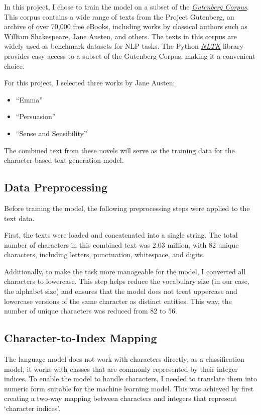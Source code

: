 \documentclass{article}
\begin{document}
In this project, I chose to train the model on a subset of the \href{https://www.gutenberg.org/}{\textit{Gutenberg Corpus}}. This corpus contains a wide range of texts from the Project Gutenberg, an archive of over 70,000 free eBooks, including works by classical authors such as William Shakespeare, Jane Austen, and others. The texts in this corpus are widely used as benchmark datasets for NLP tasks. The Python \href{https://www.nltk.org/}{\textit{NLTK}} library provides easy access to a subset of the Gutenberg Corpus, making it a convenient choice.

For this project, I selected three works by Jane Austen:

\begin{itemize}
    \item ``Emma''
    \item ``Persuasion''
    \item ``Sense and Sensibility''
\end{itemize}

The combined text from these novels will serve as the training data for the character-based text generation model.

\subsection{Data Preprocessing}

Before training the model, the following preprocessing steps were applied to the text data.

First, the texts were loaded and concatenated into a single string. The total number of characters in this combined text was 2.03 million, with 82 unique characters, including letters, punctuation, whitespace, and digits.

Additionally, to make the task more manageable for the model, I converted all characters to lowercase. This step helps reduce the vocabulary size (in our case, the alphabet size) and ensures that the model does not treat uppercase and lowercase versions of the same character as distinct entities. This way, the number of unique characters was reduced from 82 to 56.

\subsection{Character-to-Index Mapping}

The language model does not work with characters directly; as a classification model, it works with classes that are commonly represented by their integer indices. To enable the model to handle characters, I needed to translate them into numeric form suitable for the machine learning model. This was achieved by first creating a two-way mapping between characters and integers that represent `character indices'.
\end{document}
